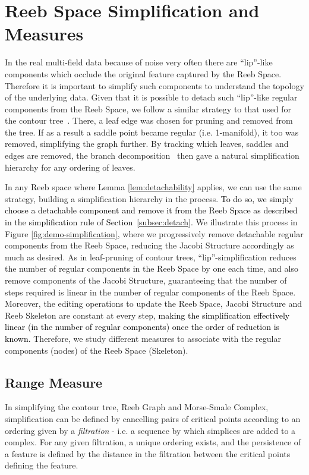 \documentclass[twocolumn]{article}
\newcommand{\figref}[1]{Figure \ref{fig:#1}}
\newcommand{\lemref}[1]{Lemma \ref{lem:#1}}
\begin{document}
 \section{Reeb Space Simplification and Measures}
\label{sec:Simplification}
In the real multi-field data because of noise 
very often there are ``lip''-like components which occlude the
original feature captured by the Reeb Space. 
Therefore it is important to simplify such components to
understand the topology of the underlying data.
Given that it is possible to detach such ``lip''-like regular components from the Reeb Space, we follow a similar strategy
to that used for the contour tree~\cite{CSv10}. There, a leaf edge was chosen for pruning
and removed from the tree. If as a result a saddle point became regular (i.e. 1-manifold), it too
was removed, simplifying the graph further. By tracking which leaves, saddles and edges are 
removed, the branch decomposition~\cite{PCS04} then gave a natural simplification 
hierarchy for any ordering of leaves.

In any Reeb space where \lemref{detachability} applies, we can use the same strategy, building
a simplification hierarchy in the process. \textcolor{black}{To do so, we simply choose a detachable 
component and remove it from the Reeb Space as described in the
simplification rule of Section~\ref{subsec:detach}.} 
We illustrate this process in \figref{demo-simplification}, where we
progressively remove detachable regular 
components from the Reeb Space, reducing the Jacobi Structure accordingly as much as desired.  As 
in leaf-pruning of contour trees, ``lip''-simplification reduces the number of regular components in the Reeb Space by one each 
time, and also remove components of the Jacobi Structure, guaranteeing that the number of steps
required is linear in the number of regular components of the Reeb Space. Moreover, the editing operations to update
the Reeb Space, Jacobi Structure and Reeb Skeleton are constant at
every step, \textcolor{black}{making the
simplification effectively linear (in the number of regular components) once the order of reduction is known.}
Therefore, we study different measures to associate with the regular
components (nodes) of the Reeb Space (Skeleton).

\subsection{Range Measure}
\label{sec:MeasurePersistence}
In simplifying the contour tree, Reeb Graph and Morse-Smale Complex, simplification can be defined 
by cancelling pairs of critical points according to an ordering given by a \emph{filtration} - i.e.
a sequence by which simplices are added to a complex.  For any given filtration, a unique ordering
exists, and the persistence of a feature is defined by the distance in the filtration between the
critical points defining the feature.  
\end{document}
